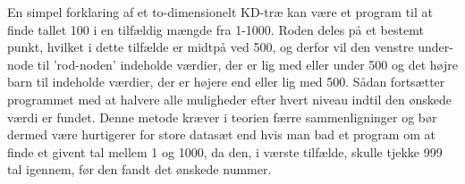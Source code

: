 En simpel forklaring af et to-dimensionelt KD-træ kan være et program til at finde tallet 100 i en tilfældig mængde fra 1-1000. Roden deles på et bestemt punkt, hvilket i dette tilfælde er midtpå ved 500, og derfor vil den venstre under-node til 'rod-noden' indeholde værdier, der er lig med eller under 500 og det højre barn til indeholde værdier, der er højere end eller lig med 500. Sådan fortsætter programmet med at halvere alle muligheder efter hvert niveau indtil den ønskede værdi er fundet. Denne metode kræver i teorien færre sammenligninger og bør dermed være hurtigerer for store datasæt end hvis man bad et program om at finde et givent tal mellem 1 og 1000, da den, i værste tilfælde, skulle tjekke 999 tal igennem, før den fandt det ønskede nummer.
